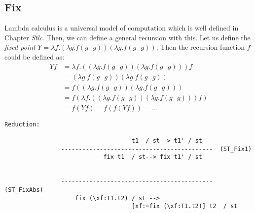 \subsection{Fix}
Lambda calculus is a universal model of computation which is well defined in Chapter \textit{Stlc}. Then, we can define a general recursion with this. Let us define the \textit{fixed point} $Y = \lambda f. (\lambda g. f(g\text{ }g))(\lambda g. f(g\text{ }g))$. Then the recursion function $f$ could be defined as:
\begin{align*}
Yf &=  \lambda f. ((\lambda g. f(g\text{ }g))(\lambda g. f(g\text{ }g))) f \\
&=  (\lambda g. f(g\text{ }g))(\lambda g. f(g\text{ }g)) \\
&= f ((\lambda g. f(g\text{ }g))(\lambda g. f(g\text{ }g))) \\
&= f (\lambda f. ((\lambda g. f(g\text{ }g))(\lambda g. f(g\text{ }g))) f ) \\
&= f(Yf) = f(f(Yf)) = ...
\end{align*}
\begin{lstlisting}
Reduction:

									t1  / st--> t1' / st'
				-------------------------------------------  (ST_Fix1)
							fix t1  / st--> fix t1' / st'

				
				-------------------------------------------  (ST_FixAbs)
					fix (\xf:T1.t2) / st --> 
									[xf:=fix (\xf:T1.t2)] t2  / st
\end{lstlisting}

